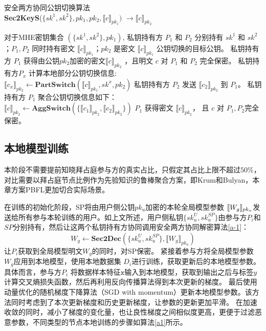 \begin{algorithm}[htbp]
	\caption{安全两方协同公钥切换算法\\ \textbf{Sec2KeyS}($\{sk^1, sk^2\}, pk_1, pk_2, \llbracket c\rrbracket_{pk_1})$ $\rightarrow \llbracket c\rrbracket_{pk_2}$}
	\label{a-2}
	\begin{algorithmic}[1]
		\REQUIRE 对于MHE密钥集合 $(\{sk^1, sk^2\}, pk_1)$, 私钥持有方 $P_1$ 和 $P_2$ 分别持有 $sk^1$ 和 $sk^2$；$P_1, P_2$ 同时持有密文 $\llbracket c\rrbracket_{pk_1}$；$pk_2$ 是密文 $\llbracket c\rrbracket_{pk_1}$ 公钥切换的目标公钥。
		\ENSURE 私钥持有方 $P_1$ 获得由公钥$pk_2$加密的密文$\llbracket c\rrbracket_{pk_2}$ ，且明文 $c$ 对 $P_1$ 和 $P_2$ 完全保密。
		\STATE  私钥持有方$P_x$ 计算本地部分公钥切换信息:\\ $\llbracket c_x\rrbracket_{pk_2} \leftarrow \textbf{PartSwitch}(\llbracket c\rrbracket_{pk_1}, sk^x, pk_2)$
		\ENDFOR
		\STATE 私钥持有方 $P_2$ 发送 $\llbracket c_2\rrbracket_{pk_2}$ 到 $P_1$。
		\STATE 私钥持有方 $P_1$ 聚合公钥切换信息如下：\\ $\llbracket c\rrbracket_{pk_2} \leftarrow \textbf{AggSwitch}(\{\llbracket c_1\rrbracket_{pk_2}, \llbracket c_2\rrbracket_{pk_2} \})$
		\RETURN $ P_1 $ 获得密文 $\llbracket c\rrbracket_{pk_2}$， 且 $c$ 对 $ P_1, P_2 $完全保密。
	\end{algorithmic}
\end{algorithm}

\subsection{本地模型训练}
本阶段不需要提前知晓拜占庭参与方的真实占比，只假定其占比上限不超过$50\%$，对比需要以拜占庭节点比例作为先验知识的鲁棒聚合方案，即Krum\cite{blanchard2017machine}和Bulyan\cite{guerraoui2018hidden}，本章方案PBFL更加切合实际场景。	

在训练的初始化阶段，SP将由用户侧公钥$ pk_u $加密的本轮全局模型参数
$ \ctx[pk_u]{W_g} $发送给所有参与本轮训练的用户。如上文所述，用户侧私钥$\{sk_u^{U}, sk_u^{SP}\}$由参与方$P_i$和$SP$分别持有，然后让这两个私钥持有方协同调用安全两方协同解密算法\ref{a-1}：
\begin{equation}\label{dec}
	W_g \leftarrow \textbf{Sec2Dec}(\{sk_u^U, sk_u^{SP}\}, \llbracket W_g\rrbracket_{pk_u})
\end{equation}
让$ P_i $获取到全局模型明文$ W_g $的同时，对SP保密。
紧接着参与方将全局模型参数$ W_g $应用到本地模型，使用本地数据集
$ D_i $进行训练，获取更新后的本地模型参数。具体而言，参与方$P_i$ 将数据样本特征$\mathtt{x}$输入到本地模型，获取到输出之后与标签$ y $计算交叉熵损失函数，然后再利用反向传播算法得到本次更新的梯度。
最后使用动量优化的随机梯度下降算法（SGD with momentum）更新本地模型参数。该方法同时考虑到了本次更新梯度和历史更新梯度，让参数的更新更加平滑。
在加速收敛的同时，减小了梯度的变化量，也让良性梯度之间相似度更高，更便于过滤恶意参数，不同类型的节点本地训练的步骤如算法\ref{a1}所示。

